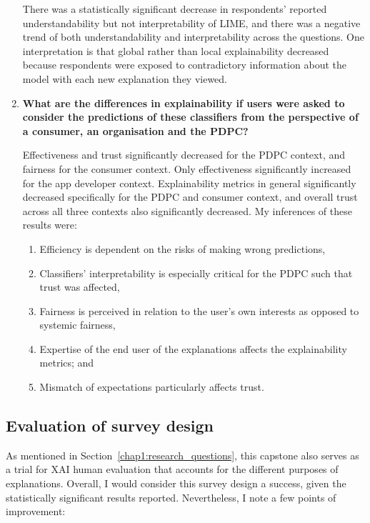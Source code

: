 \begin{enumerate}
    There was a statistically significant decrease in respondents' reported understandability but not interpretability of LIME, and there was a negative trend of both understandability and interpretability across the questions. One interpretation is that global rather than local explainability decreased because respondents were exposed to contradictory information about the model with each new explanation they viewed.

    \item \textbf{What are the differences in explainability if users were asked to consider the predictions of these classifiers from the perspective of a consumer, an organisation and the PDPC?}
    
    Effectiveness and trust significantly decreased for the PDPC context, and fairness for the consumer context. Only effectiveness significantly increased for the app developer context. Explainability metrics in general significantly decreased specifically for the PDPC and consumer context, and overall trust across all three contexts also significantly decreased. My inferences of these results were:
    \begin{enumerate}
        \item Efficiency is dependent on the risks of making wrong predictions,
        \item Classifiers' interpretability is especially critical for the PDPC such that trust was affected,
        \item Fairness is perceived in relation to the user's own interests as opposed to systemic fairness,
        \item Expertise of the end user of the explanations affects the explainability metrics; and
        \item Mismatch of expectations particularly affects trust.
    \end{enumerate}
\end{enumerate}

\subsection{Evaluation of survey design}
As mentioned in Section~\ref{chap1:research_questions}, this capstone also serves as a trial for XAI human evaluation that accounts for the different purposes of explanations. Overall, I would consider this survey design a success, given the statistically significant results reported. Nevertheless, I note a few points of improvement:

